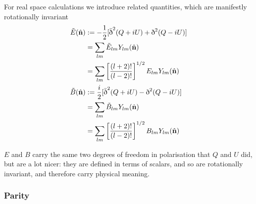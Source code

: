 \documentclass[a4paper,10pt]{article}
\renewcommand{\v}[1]{\mathbf{#1}}
\newcommand{\half}{\frac{1}{2}}
\newcommand{\unit}[1]{\hat{\v{#1}}}
\newcommand{\sr}{\text{\normalfont\dh}}
\renewcommand{\sl}{\bar{\text{\normalfont\dh}}}
\newcommand{\ltwo}{\left[\frac{(l+2)!}{(l-2)!}\right]}
\begin{document}
For real space calculations we introduce related quantities, which are manifestly rotationally invariant
\begin{equation}\begin{split}
\tilde{E}(\unit{n}) &:= -\half[\sl^2(Q+iU) + \sr^2(Q-iU)]\\
&= \sum_{lm} \tilde{E}_{lm}Y_{lm}(\unit{n})\\
&= \sum_{lm} \ltwo^{1/2}E_{lm}Y_{lm}(\unit{n})\\
\tilde{B}(\unit{n}) &:= \frac{i}{2}[\sl^2(Q+iU) - \sr^2(Q-iU)]\\
&= \sum_{lm} \tilde{B}_{lm}Y_{lm}(\unit{n})\\
&= \sum_{lm} \ltwo^{1/2}B_{lm}Y_{lm}(\unit{n})
\label{EBmodes}
\end{split}\end{equation}

$E$ and $B$ carry the same two degrees of freedom in polarisation that $Q$ and $U$ did, but are a lot nicer: they are defined in terms of scalars, and so are rotationally invariant, and therefore carry physical meaning.

\subsubsection{Parity}
\end{document}
